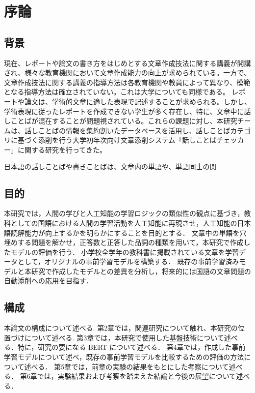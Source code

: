 \chapter{序論\label{c1}}

\section{背景}
現在、レポートや論文の書き方をはじめとする文章作成技法に関する講義が開講され、様々な教育機関において文章作成能力の向上が求められている。一方で、文章作成技法に関する講義の指導方法は各教育機関や教員によって異なり、模範となる指導方法は確立されていない。これは大学についても同様である。
レポートや論文は、学術的文章に適した表現で記述することが求められる。しかし、学術表現に従ったレポートを作成できない学生が多く存在し、特に、文章中に話しことばが混在することが問題視されている。これらの課題に対し、本研究チームは、話しことばの情報を集約割いたデータベースを活用し、話しことばカテゴリに基づく添削を行う大学初年次向け文章添削システム「話しことばチェッカー」に関する研究を行ってきた。

日本語の話しことばや書きことばは、文章内の単語や、単語同士の関

\section{目的}
本研究では，人間の学びと人工知能の学習ロジックの類似性の観点に基づき，教科としての国語における人間の学習活動を人工知能に再現させ，人工知能の日本語読解能力が向上するかを明らかにすることを目的とする．
文章中の単語を穴埋めする問題を解かせ，正答数と正答した品詞の種類を用いて，本研究で作成したモデルの評価を行う．
小学校全学年の教科書に掲載されている文章を学習データとして，オリジナルの事前学習モデルを構築する．
既存の事前学習済みモデルと本研究で作成したモデルとの差異を分析し，将来的には国語の文章問題の自動添削への応用を目指す．

\section{構成}
本論文の構成について述べる.
第2章では，関連研究について触れ、本研究の位置づけについて述べる.
第3章では，本研究で使用した基盤技術について述べる．特に，研究の要になる BERT について述べる．
第4章では，作成した事前学習モデルについて述べ，既存の事前学習モデルを比較するための評価の方法について述べる．
第5章では，前章の実験の結果をもとにした考察について述べる．
第6章では，実験結果および考察を踏まえた結論と今後の展望について述べる．
